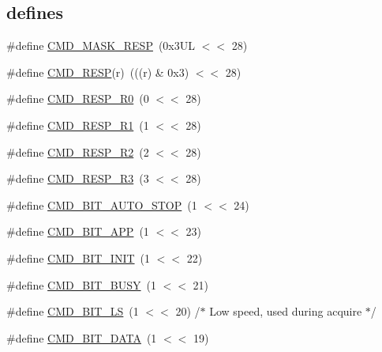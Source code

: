 \subsection*{\textquotesingle{}defines\textquotesingle{}}
\begin{DoxyCompactItemize}
\item 
\#define \hyperlink{group___s_d_m_m_c__18_x_x__43_x_x_gab956d2cc0062315242a2ccd388f1e358}{C\+M\+D\+\_\+\+M\+A\+S\+K\+\_\+\+R\+E\+SP}~(0x3\+U\+L $<$$<$ 28)
\item 
\#define \hyperlink{group___s_d_m_m_c__18_x_x__43_x_x_ga91c1b8c0d47030e80d4ff6259b169175}{C\+M\+D\+\_\+\+R\+E\+SP}(r)~(((r) \& 0x3) $<$$<$ 28)
\item 
\#define \hyperlink{group___s_d_m_m_c__18_x_x__43_x_x_ga8a85b87724ffe5fa4d558ae128f21585}{C\+M\+D\+\_\+\+R\+E\+S\+P\+\_\+\+R0}~(0 $<$$<$ 28)
\item 
\#define \hyperlink{group___s_d_m_m_c__18_x_x__43_x_x_ga6f03bbba43ba479f018f7ef76e2258f5}{C\+M\+D\+\_\+\+R\+E\+S\+P\+\_\+\+R1}~(1 $<$$<$ 28)
\item 
\#define \hyperlink{group___s_d_m_m_c__18_x_x__43_x_x_ga3e9cc9d9af65b99b95dc6139a3db322a}{C\+M\+D\+\_\+\+R\+E\+S\+P\+\_\+\+R2}~(2 $<$$<$ 28)
\item 
\#define \hyperlink{group___s_d_m_m_c__18_x_x__43_x_x_gaa401bdbd962023c1773d917a2c99b110}{C\+M\+D\+\_\+\+R\+E\+S\+P\+\_\+\+R3}~(3 $<$$<$ 28)
\item 
\#define \hyperlink{group___s_d_m_m_c__18_x_x__43_x_x_ga54467a0e80fd68c54419d4e6598c05d8}{C\+M\+D\+\_\+\+B\+I\+T\+\_\+\+A\+U\+T\+O\+\_\+\+S\+T\+OP}~(1 $<$$<$ 24)
\item 
\#define \hyperlink{group___s_d_m_m_c__18_x_x__43_x_x_ga201daaaa1ac9cd5e8e9c6cc3a1472038}{C\+M\+D\+\_\+\+B\+I\+T\+\_\+\+A\+PP}~(1 $<$$<$ 23)
\item 
\#define \hyperlink{group___s_d_m_m_c__18_x_x__43_x_x_gaddd67f85312e1b1fb2d2a83a540a4427}{C\+M\+D\+\_\+\+B\+I\+T\+\_\+\+I\+N\+IT}~(1 $<$$<$ 22)
\item 
\#define \hyperlink{group___s_d_m_m_c__18_x_x__43_x_x_gaad6daa707d0fd2762f906bd1dc2cc240}{C\+M\+D\+\_\+\+B\+I\+T\+\_\+\+B\+U\+SY}~(1 $<$$<$ 21)
\item 
\#define \hyperlink{group___s_d_m_m_c__18_x_x__43_x_x_gac7c44bedf5c41fd5ed18712aa2ef69a7}{C\+M\+D\+\_\+\+B\+I\+T\+\_\+\+LS}~(1 $<$$<$ 20)	/$\ast$ Low speed, used during acquire $\ast$/
\item 
\#define \hyperlink{group___s_d_m_m_c__18_x_x__43_x_x_gac4b629fb5a202bac675389cf3e28a197}{C\+M\+D\+\_\+\+B\+I\+T\+\_\+\+D\+A\+TA}~(1 $<$$<$ 19)

\end{DoxyCompactItemize}
